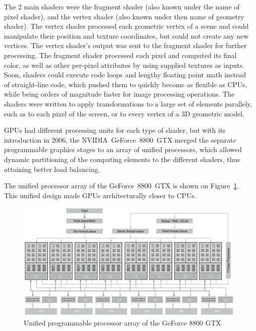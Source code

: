 \documentclass[10pt, a4paper]{report}
\begin{document}
The 2 main shaders were the fragment shader (also known under the name of pixel
shader), and the vertex shader (also known under then name of geometry shader).
The vertex shader processed each geometric vertex of a scene and could
manipulate their position and texture coordinates, but could not create any new
vertices.
The vertex shader's output was sent to the fragment shader for further
processing.
The fragment shader processed each pixel and computed its final color, as well
as other per-pixel attributes by using supplied textures as inputs.
Soon, shaders could execute code loops and lengthy floating point math instead
of straight-line code, which pushed them to quickly become as flexible as CPUs,
while being orders of magnitude faster for image processing operations.
The shaders were written to apply transformations to a large set of elements
parallely, such as to each pixel of the screen, or to every vertex of a 3D
geometric model.

GPUs had different processing units for each type of shader, but with its
introduction in 2006, the NVIDIA~GeForce~8800~GTX merged the separate
programmable graphics stages to an array of unified processors, which allowed
dynamic partitioning of the computing elements to the different shaders, thus
attaining better load balancing.

The unified processor array of the GeForce~8800~GTX is shown on
Figure~\ref{fig:unified_programmable_processor_array_of_the_GeForce_8800_GTX_graphics_pipeline}.
This unified design made GPUs architecturally closer to CPUs.

\begin{figure}
\includegraphics[width=\linewidth]{figs/unified_programmable_processor_array_of_the_GeForce_8800_GTX_graphics_pipeline}
\caption{Unified programmable processor array of the GeForce 8800 GTX}
\label{fig:unified_programmable_processor_array_of_the_GeForce_8800_GTX_graphics_pipeline}
\end{figure}
\end{document}
